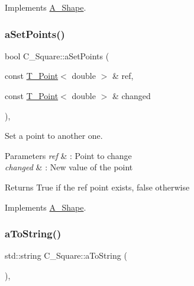 Implements \hyperlink{classA__Shape_a25b4e0c34cdb46da5382fe9c7467efaf}{A\+\_\+\+Shape}.

\mbox{\label{classC__Square_a295a170686422b745587a250ebe08a5e}} 
\subsubsection{\texorpdfstring{a\+Set\+Points()}{aSetPoints()}}
{\footnotesize\ttfamily bool C\+\_\+\+Square\+::a\+Set\+Points (\begin{DoxyParamCaption}\item[{const \hyperlink{classT__Point}{T\+\_\+\+Point}$<$ double $>$ \&}]{ref,  }\item[{const \hyperlink{classT__Point}{T\+\_\+\+Point}$<$ double $>$ \&}]{changed }\end{DoxyParamCaption})\hspace{0.3cm}{\ttfamily [override]}, {\ttfamily [virtual]}}



Set a point to another one. 


\begin{DoxyParams}{Parameters}
{\em ref} & \+: Point to change \\
\hline
{\em changed} & \+: New value of the point \\
\hline
\end{DoxyParams}
\begin{DoxyReturn}{Returns}
True if the ref point exists, false otherwise 
\end{DoxyReturn}


Implements \hyperlink{classA__Shape_a6996f454b337f8425ad13cba3f7a7c35}{A\+\_\+\+Shape}.

\mbox{\label{classC__Square_ab2cada51b25cd35b9a79e461767e56f0}} 
\subsubsection{\texorpdfstring{a\+To\+String()}{aToString()}}
{\footnotesize\ttfamily std\+::string C\+\_\+\+Square\+::a\+To\+String (\begin{DoxyParamCaption}{ }\end{DoxyParamCaption})\hspace{0.3cm}{\ttfamily [override]}, {\ttfamily [virtual]}}



